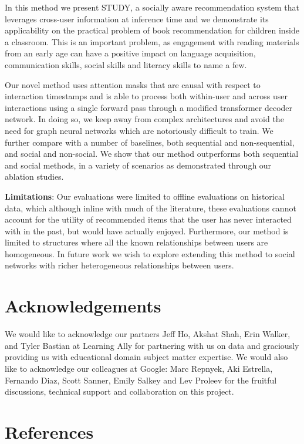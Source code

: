 \documentclass{article}
\begin{document}
In this method we present STUDY, a socially aware recommendation system that leverages cross-user information at inference time and we demonstrate its applicability on the practical problem of book recommendation for children inside a classroom. This is an important problem, as engagement with reading materials from an early age can have a positive impact on language acquisition, communication skills, social skills and literacy skills to name a few.

Our novel method uses attention masks that are causal with respect to interaction timestamps and is able to process both within-user and across user interactions using a single forward pass through a modified transformer decoder network. In doing so, we keep away from complex architectures and avoid the need for graph neural networks which are notoriously difficult to train. We further compare with a number of baselines, both sequential and non-sequential, and social and non-social. We show that our method outperforms both sequential and social methods, in a variety of scenarios as demonstrated through our ablation studies.

\textbf{Limitations}: Our evaluations were limited to offline evaluations on historical data, which although inline with much of the literature, these evaluations cannot account for the utility of recommended items that the user has never interacted with in the past, but would have actually enjoyed. Furthermore, our method is limited to structures where all the known relationships between users are homogeneous. In future work we wish to explore extending this method to social networks with richer heterogeneous relationships between users.

\section{Acknowledgements}
We would like to acknowledge our partners Jeff Ho, Akshat Shah, Erin Walker, and Tyler Bastian at Learning Ally for partnering with us on data and graciously providing us with educational domain subject matter expertise. We would also like to acknowledge our colleagues at Google: Marc Repnyek, Aki Estrella, Fernando Diaz, Scott Sanner, Emily Salkey and Lev Proleev for the fruitful discussions, technical support and collaboration on this project.



\FloatBarrier


\section*{References}
\end{document}
